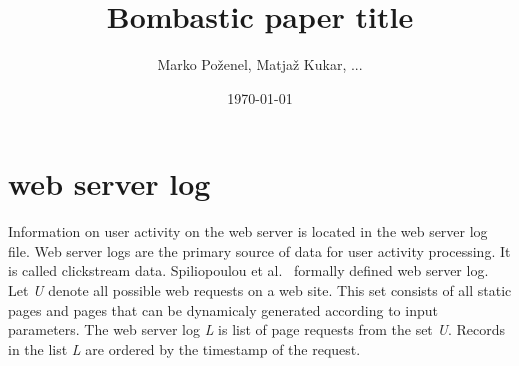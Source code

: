 \documentclass[a4paper,10pt]{article}
\title{
 Bombastic paper title
}
\author{
    Marko Po\v{z}enel, Matja\v{z} Kukar, ...
}
\date{\today}
\begin{document}
\doublespacing
\maketitle

\section{web server log}
Information on user activity on the web server is located in the web server log file. Web server
logs are the primary source of data for user activity processing. It is called clickstream data.
Spiliopoulou et al.~\cite{Spiliopoulou2003} formally defined web server log. Let \textit{U} denote
all possible web requests on a web site. This set consists of all static pages and pages that can
be dynamicaly generated according to input parameters. The web server log \textit{L} is list of
page requests from the set \textit{U}. Records in the list \textit{L} are ordered by the timestamp
of the request.
\end{document}
